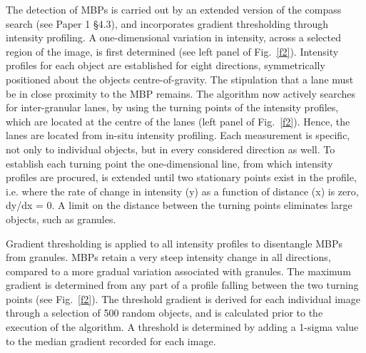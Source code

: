 \documentclass{emulateapj}
\begin{document}
The detection of MBPs is carried out by an extended version of the compass search (see Paper 1 {\S}4.3), and incorporates gradient thresholding through intensity profiling.  A one-dimensional variation in intensity, across a selected region of the image, is first determined (see left panel of Fig.~\ref{f2}).  Intensity profiles for each object are established for eight directions, symmetrically positioned about the objects centre-of-gravity.  The stipulation that a lane must be in close proximity to the MBP remains.  The algorithm now actively searches for inter-granular lanes, by using the turning points of the intensity profiles,  which are located at the centre of the lanes (left panel of Fig.~\ref{f2}).  Hence, the lanes are located from in-situ intensity profiling. Each measurement is specific, not only to individual objects, but in every considered direction as well.  To establish each turning point the one-dimensional line, from which intensity profiles are procured, is extended until two stationary points exist in the profile, i.e. where the rate of change in intensity (y) as a function of distance (x) is zero, dy/dx = 0.  A limit on the distance between the turning points eliminates large objects, such as granules.

Gradient thresholding is applied to all intensity profiles to disentangle MBPs from granules.  MBPs retain a very steep intensity change in all directions, compared to a more gradual variation associated with granules. The maximum gradient is determined from any part of a profile falling between the two turning points (see Fig.~\ref{f2}).  The threshold gradient is derived for each individual image through a selection of 500 random objects, and is calculated prior to the execution of the algorithm.  A threshold is determined by adding a 1-sigma value to the median gradient recorded for each image.
\end{document}
